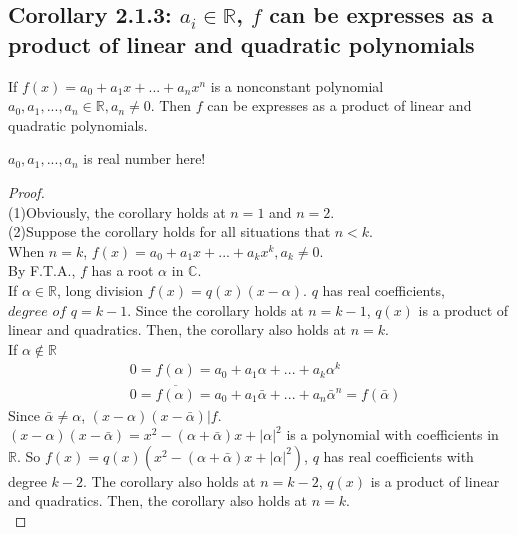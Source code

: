 \documentclass[11pt]{elegantbook}
\begin{document}
\subsection{Corollary 2.1.3: $a_i\in \mathbb{R}$, $f$ can be expresses as a product of linear and quadratic polynomials}
\begin{corollary}[Corollary 2.1.3]
    If $f (x) = a_0 + a_1x + ... + a_nx^n$ is a nonconstant
    polynomial $a_0, a_1, ..., a_n \in \mathbb{R}, a_n \neq 0$.
    Then $f$ can be expresses as a product of linear and quadratic polynomials.
\end{corollary}
$a_0, a_1, ..., a_n$ is real number here!
\begin{proof}
\quad\\
(1)Obviously, the corollary holds at $n=1$ and $n=2$.\\
(2)Suppose the corollary holds for all situations that $n<k$.\\
When $n=k$, $f (x) = a_0 + a_1x + ... + a_kx^k, a_k\neq 0$.\\
By F.T.A., $f$ has a root $\alpha$ in $\mathbb{C}$.\\
If $\alpha\in\mathbb{R}$, long division $f(x)=q(x)(x-\alpha)$. $q$ has real coefficients, $\textit{degree of }q=k-1$. Since the corollary holds at $n=k-1$, $q(x)$ is a product of linear and quadratics. Then, the corollary also holds at $n=k$.\\
If $\alpha\notin\mathbb{R}$
\begin{equation}
    \begin{aligned}
        &0=f(\alpha)=a_0+a_1\alpha+...+a_k\alpha^k\\
        &0=\overline{f(\alpha)}={a_0}+{a_1}\bar{\alpha}+...+{a_n}\bar{\alpha}^n=f(\bar{\alpha})
    \end{aligned}
    \nonumber
\end{equation}
Since $\bar{\alpha}\neq\alpha$, $(x-\alpha)(x-\bar{\alpha})|f$.\\
$(x-\alpha)(x-\bar{\alpha})=x^2-(\alpha+\bar{\alpha})x+|\alpha|^2$ is a polynomial with coefficients in $\mathbb{R}$. So $f(x)=q(x)(x^2-(\alpha+\bar{\alpha})x+|\alpha|^2)$, $q$ has real coefficients with degree $k-2$. The corollary also holds at $n=k-2$, $q(x)$ is a product of linear and quadratics. Then, the corollary also holds at $n=k$.\\
\end{proof}
\end{document}
